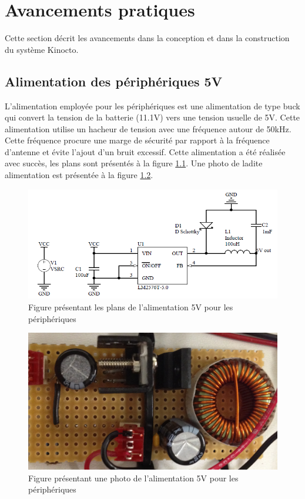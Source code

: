 


\chapter{Avancements pratiques}
\label{s:avancement}
Cette section décrit les avancements dans la conception et dans la construction du système Kinocto.
\section{Alimentation des périphériques 5V}
L'alimentation employée pour les périphériques est une alimentation de type buck qui convert la tension de la batterie (11.1V) vers une tension usuelle de 5V. Cette alimentation utilise un hacheur de tension avec une fréquence autour de 50kHz. Cette fréquence procure une marge de sécurité par rapport à la fréquence d'antenne et évite l'ajout d'un bruit excessif. Cette alimentation a été réalisée avec succès, les plans sont présentés à la figure \ref{fig:alim5V}. Une photo de ladite alimentation est présentée à la figure \ref{fig:alim5Vphoto}.

\begin{figure}[htbp]
\centering
\includegraphics[scale=0.5]{fig/alim_5V.png}
\caption{Figure présentant les plans de l'alimentation 5V pour les périphériques}
\label{fig:alim5V}
\end{figure}

\begin{figure}[htbp]
\centering
\includegraphics[scale=0.2]{fig/alim_5V_photo.png}
\caption{Figure présentant une photo de l'alimentation 5V pour les périphériques}
\label{fig:alim5Vphoto}
\end{figure}

